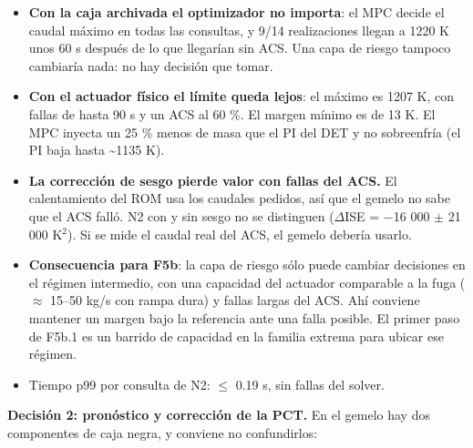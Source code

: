 \documentclass[11pt,a4paper]{article}
\begin{document}
\begin{itemize}
\item \textbf{Con la caja archivada el optimizador no importa}: el MPC decide el caudal máximo en todas las consultas, y 9/14 realizaciones llegan a 1220 K unos 60 s después de lo que llegarían sin ACS. Una capa de riesgo tampoco cambiaría nada: no hay decisión que tomar.
\item \textbf{Con el actuador físico el límite queda lejos}: el máximo es 1207 K, con fallas de hasta 90 s y un ACS al 60 \%. El margen mínimo es de 13 K. El MPC inyecta un 25 \% menos de masa que el PI del DET y no sobreenfría (el PI baja hasta \textasciitilde{}1135 K).
\item \textbf{La corrección de sesgo pierde valor con fallas del ACS.} El calentamiento del ROM usa los caudales pedidos, así que el gemelo no sabe que el ACS falló. N2 con y sin sesgo no se distinguen ($\Delta$ISE = $-$16 000 $\pm$ 21 000 K$^{2}$). Si se mide el caudal real del ACS, el gemelo debería usarlo.
\item \textbf{Consecuencia para F5b}: la capa de riesgo sólo puede cambiar decisiones en el régimen intermedio, con una capacidad del actuador comparable a la fuga ($\approx$ 15–50 kg/s con rampa dura) y fallas largas del ACS. Ahí conviene mantener un margen bajo la referencia ante una falla posible. El primer paso de F5b.1 es un barrido de capacidad en la familia extrema para ubicar ese régimen.
\item Tiempo p99 por consulta de N2: $\le$ 0.19 s, sin fallas del solver.
\end{itemize}

\textbf{Decisión 2: pronóstico y corrección de la PCT.} En el gemelo hay dos componentes de caja negra, y conviene no confundirlos:
\end{document}
